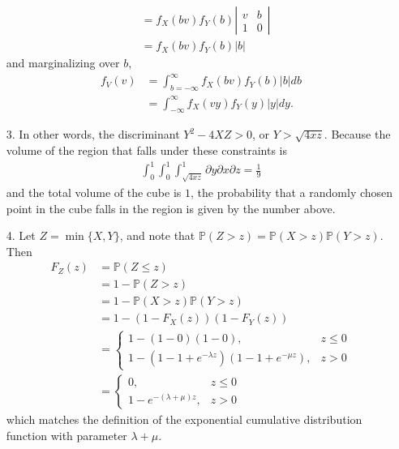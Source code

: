 \documentclass[a4paper,12pt]{article}
\begin{document}
\begin{enumerate}
\begin{align*}
            &= f_X(bv) f_Y(b)
            \left| \begin{array}{cc}
                v & b \\
                1 & 0
            \end{array} \right| \\
            &= f_X(bv) f_Y(b) |b|
        \end{align*}
        and marginalizing over $b$,
        \begin{align*}
            f_V(v) &= \int_{b = -\infty}^{\infty} f_X(bv) f_Y(b) |b| db \\
            &= \int_{-\infty}^{\infty} f_X(vy) f_Y(y) |y| dy.
        \end{align*}

    \item[3.] 
        In other words, the discriminant $Y^2 - 4XZ > 0$, or $Y > \sqrt{4xz}$. Because the volume of the region that falls under these constraints is
        \begin{align*}
            \int_0^1 \int_0^1 \int_{\sqrt{4xz}}^1 \partial y \partial x \partial z = \frac{1}{9}
        \end{align*}
        and the total volume of the cube is $1$, the probability that a randomly chosen point in the cube falls in the region is given by the number above.

    \item[4.] 
        Let $Z = \min\{X, Y\}$, and note that $\mathbb{P}(Z > z) = \mathbb{P}(X > z) \mathbb{P}(Y > z)$. Then
        \begin{align*}
            F_Z(z) &= \mathbb{P}(Z \leq z) \\
            &= 1 - \mathbb{P}(Z > z) \\
            &= 1 - \mathbb{P}(X > z) \mathbb{P}(Y > z) \\
            &= 1 - (1 - F_X(z)) (1 - F_Y(z)) \\
            &= \begin{cases}
                1 - (1 - 0)(1 - 0), &z \leq 0 \\
                1 - (1 - 1 + e^{-\lambda z}) (1 - 1 + e^{-\mu z}), &z > 0
            \end{cases} \\
            &= \begin{cases}
                0, &z \leq 0 \\
                1 - e^{-(\lambda + \mu) z}, &z > 0
            \end{cases}
        \end{align*}
        which matches the definition of the exponential cumulative distribution function with parameter $\lambda + \mu$.


\end{enumerate}
\end{document}
